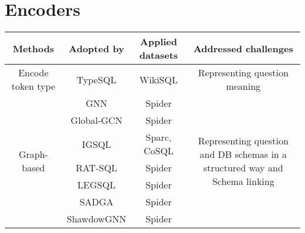 \section{Encoders}
\label{sec:encoders}

\begin{table}
    \centering
    \begin{tabular}{|c|c|c|c|}
        \hline
        \rowcolor{Gray}
        \textbf{Methods}                & \textbf{Adopted by} & \textbf{Applied datasets} & \textbf{Addressed challenges}                                                                              \\
        \hline

        Encode token type               & TypeSQL             & WikiSQL                   & Representing question meaning                                                                              \\
        \hline
        \multirow{8}{*}{Graph-based}    & GNN                 & Spider                    & \multirow{8}{*}{\parbox{5cm}{Representing question and DB schemas in a structured way and Schema linking}} \\
                                        & Global-GCN          & Spider                    &                                                                                                            \\
                                        & IGSQL               & Sparc, CoSQL              &                                                                                                            \\
                                        & RAT-SQL             & Spider                    &                                                                                                            \\
                                        & LEGSQL              & Spider                    &                                                                                                            \\
                                        & SADGA               & Spider                    &                                                                                                            \\
                                        & ShawdowGNN          & Spider                    &                                                                                                            \\

\end{tabular}
\end{table}
